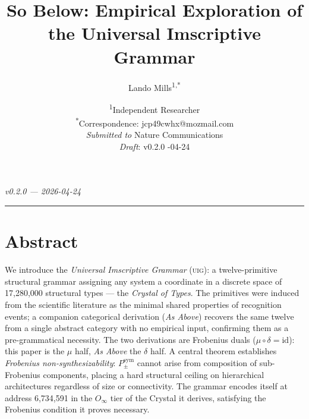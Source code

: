 \documentclass[12pt,a4paper]{article}
\newcommand{\Ppms}{P_{\pm}^{\text{sym}}}
\newcommand{\Oinf}{O_\infty}
\newcommand{\UIG}{\textsc{uig}}
\begin{document}
\title{So Below: Empirical Exploration of the Universal Imscriptive Grammar}

\author{
  Lando Mills\textsuperscript{1,*}
}

\date{
  \textsuperscript{1}Independent Researcher\\[4pt]
  \textsuperscript{*}Correspondence: jcp49cwhx@mozmail.com\\[8pt]
  \emph{Submitted to} Nature Communications\\
  \emph{Draft}: v0.2.0 -04-24
}

\maketitle

\emph{v0.2.0 --- 2026-04-24}

\begin{center}
\rule{0.5\textwidth}{0.4pt}
\end{center}

\section*{Abstract}

We introduce the \emph{Universal Imscriptive Grammar} (\UIG): a twelve-primitive
structural grammar assigning any system a coordinate in a discrete space of
17,280,000 structural types --- the \emph{Crystal of Types}. The primitives were
induced from the scientific literature as the minimal shared properties of recognition
events; a companion categorical derivation (\emph{As Above}) recovers the same twelve
from a single abstract category with no empirical input, confirming them as a
pre-grammatical necessity. The two derivations are Frobenius duals ($\mu \circ \delta =
\text{id}$): this paper is the $\mu$ half, \emph{As Above} the $\delta$ half. A central
theorem establishes \emph{Frobenius non-synthesizability}: $\Ppms$ cannot arise from
composition of sub-Frobenius components, placing a hard structural ceiling on
hierarchical architectures regardless of size or connectivity. The grammar encodes
itself at address 6,734,591 in the $\Oinf$ tier of the Crystal it derives, satisfying
the Frobenius condition it proves necessary.
\end{document}

